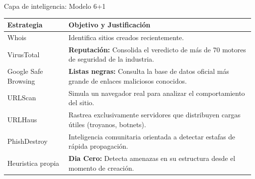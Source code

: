 \documentclass{beamer}
\begin{document}
\begin{frame}{Capa de inteligencia: Modelo 6+1}

\renewcommand{\arraystretch}{1.3}

\begin{table}[htbp]
\centering
\begin{tabularx}{\textwidth}{l X}
\toprule
\textbf{Estrategia} & \textbf{Objetivo y Justificación} \\
\midrule
Whois & Identifica sitios creados recientemente. \\
VirusTotal & \textbf{Reputación:} Consolida el veredicto de más de 70 motores de seguridad de la industria. \\
Google Safe Browsing & \textbf{Listas negras:} Consulta la base de datos oficial más grande de enlaces maliciosos conocidos. \\
URLScan & Simula un navegador real para analizar el comportamiento del sitio. \\
URLHaus & Rastrea exclusivamente servidores que distribuyen cargas útiles (troyanos, botnets). \\
PhishDestroy & Inteligencia comunitaria orientada a detectar estafas de rápida propagación. \\
Heuristica propia & \textbf{Dia Cero:} Detecta amenazas en su estructura desde el momento de creación. \\
\bottomrule
\end{tabularx}
\end{table}

\end{frame}
\end{document}
